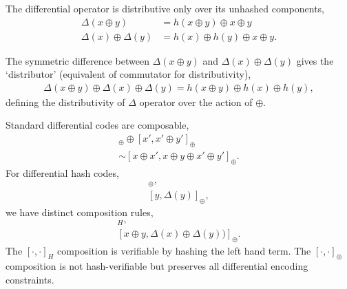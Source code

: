 \documentclass[twocolumn, aps, amsmath, amssymb, nofootinbib, superscriptaddress, longbibliography, doublefloatfix, table-of-contents, eqsecnum, rmp]{revtex4-2}
\begin{document}
The differential operator is distributive only over its unhashed components,
\begin{align}
	\Delta(x\oplus y) &= h(x\oplus y)\oplus x\oplus y \nonumber\\
	\Delta(x)\oplus\Delta(y) &= h(x)\oplus h(y)\oplus x\oplus y.
\end{align}





The symmetric difference between $\Delta(x\oplus y)$ and $\Delta(x)\oplus\Delta(y)$ gives the `distributor' (equivalent of commutator for distributivity),
\begin{align}
	\Delta(x\oplus y)\oplus \Delta(x)\oplus \Delta(y) = h(x\oplus y) \oplus h(x)\oplus h(y),
\end{align}
defining the distributivity of $\Delta$ operator over the action of $\oplus$.

Standard differential codes are composable,
\begin{align}
	[x,x\oplus y)]_\oplus \oplus [x',x'\oplus y']_\oplus\nonumber\\
	\sim [x\oplus x', x\oplus y \oplus x' \oplus y']_\oplus.
\end{align}
For differential hash codes,
\begin{align}
	[x,\Delta(x)]_\oplus,\nonumber\\
	[y,\Delta(y)]_\oplus,
\end{align}
we have distinct composition rules,
\begin{align}
	[x\oplus y,\Delta(x\oplus y)]_H,\nonumber\\
	[x\oplus y,\Delta(x) \oplus \Delta(y))]_\oplus.
\end{align}
The $[\cdot,\cdot]_H$ composition is verifiable by hashing the left hand term. The $[\cdot,\cdot]_\oplus$ composition is not hash-verifiable but preserves all differential encoding constraints.
\end{document}
